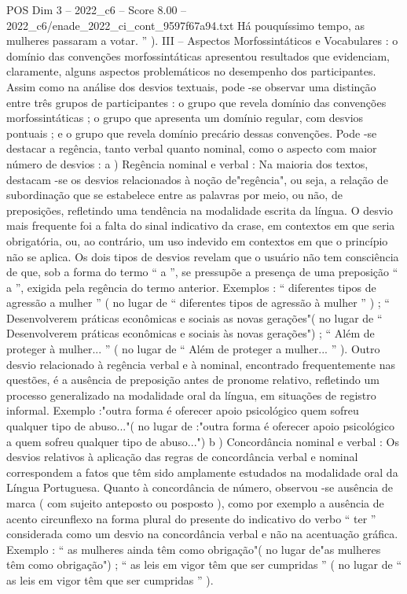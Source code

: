\begin{textsample}{POS Dim 3 – 2022\_c6 – Score 8.00 – 2022\_c6/enade\_2022\_ci\_cont\_9597f67a94.txt}
Há pouquíssimo tempo, as mulheres passaram a votar. ” ).
III – Aspectos Morfossintáticos e Vocabulares : o domínio das convenções morfossintáticas apresentou resultados que evidenciam, claramente, alguns aspectos problemáticos no desempenho dos participantes.
Assim como na análise dos desvios textuais, pode -se observar uma distinção entre três grupos de participantes : o grupo que revela domínio das convenções morfossintáticas ; o grupo que apresenta um domínio regular, com desvios pontuais ; e o grupo que revela domínio precário dessas convenções.
Pode -se destacar a regência, tanto verbal quanto nominal, como o aspecto com maior número de desvios : a ) Regência nominal e verbal : Na maioria dos textos, destacam -se os desvios relacionados à noção de"regência", ou seja, a relação de subordinação que se estabelece entre as palavras por meio, ou não, de preposições, refletindo uma tendência na modalidade escrita da língua.
O desvio mais frequente foi a falta do sinal indicativo da crase, em contextos em que seria obrigatória, ou, ao contrário, um uso indevido em contextos em que o princípio não se aplica.
Os dois tipos de desvios revelam que o usuário não tem consciência de que, sob a forma do termo “ a ”, se pressupõe a presença de uma preposição “ a ”, exigida pela regência do termo anterior.
Exemplos : “ diferentes tipos de agressão a mulher ” ( no lugar de “ diferentes tipos de agressão à mulher ” ) ; “ Desenvolverem práticas econômicas e sociais as novas gerações"( no lugar de “ Desenvolverem práticas econômicas e sociais às novas gerações") ; “ Além de proteger à mulher... ” ( no lugar de “ Além de proteger a mulher... ” ).
Outro desvio relacionado à regência verbal e à nominal, encontrado frequentemente nas questões, é a ausência de preposição antes de pronome relativo, refletindo um processo generalizado na modalidade oral da língua, em situações de registro informal.
Exemplo :"outra forma é oferecer apoio psicológico quem sofreu qualquer tipo de abuso..."( no lugar de :"outra forma é oferecer apoio psicológico a quem sofreu qualquer tipo de abuso...") b ) Concordância nominal e verbal : Os desvios relativos à aplicação das regras de concordância verbal e nominal correspondem a fatos que têm sido amplamente estudados na modalidade oral da Língua Portuguesa.
Quanto à concordância de número, observou -se ausência de marca ( com sujeito anteposto ou posposto ), como por exemplo a ausência de acento circunflexo na forma plural do presente do indicativo do verbo “ ter ” considerada como um desvio na concordância verbal e não na acentuação gráfica.
Exemplo : “ as mulheres ainda têm como obrigação"( no lugar de"as mulheres têm como obrigação") ; “ as leis em vigor têm que ser cumpridas ” ( no lugar de “ as leis em vigor têm que ser cumpridas ” ).

\end{textsample}
